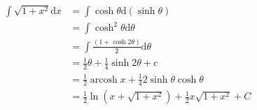 \documentclass[lang=cn,newtx,10pt,scheme=chinese]{elegantbook}
\DeclareMathOperator{\arcosh}{arcosh}
\begin{document}
\begin{example}
  \begin{equation}
    \begin{aligned}
    \int \sqrt{1+x^{2}} \mathrm{d}x & =\int \cosh \theta \mathrm{d}(\sinh \theta)\\
    &=\int \cosh ^{2}\theta \mathrm{d}\theta\\
    &=\int \frac{(1+ \cosh 2\theta)}{2} \mathrm{d}\theta \\
    &=\frac{1}{2} \theta +\frac{1}{4} \sinh 2\theta+c\\
    &=\frac{1}{2}  \arcosh x+\frac{1}{4} 2 \sinh \theta \cosh \theta\\
    &=\frac{1}{2} \ln(x+\sqrt{1+x^{2}})+\frac{1}{2}x \sqrt{1+x^{2}}+C
    \end{aligned}
  \end{equation}
\end{example}
\end{document}
